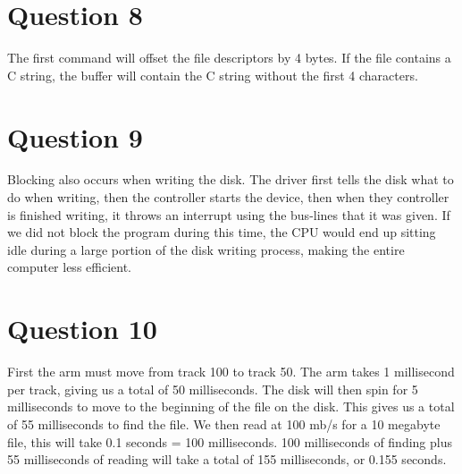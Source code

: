 \documentclass[12pt]{extarticle}
\begin{document}
		\section*{Question 8}
			The first command will offset the file descriptors by 4 bytes.  If the file contains a C string, the buffer will contain the C string without the first 4 characters.

		\section*{Question 9}
			Blocking also occurs when writing the disk.  The driver first tells the disk what to do when writing, then the controller starts the device, then when they controller is finished writing, it throws an interrupt using the bus-lines that it was given.  If we did not block the program during this time,  the CPU would end up sitting idle during a large portion of the disk writing process, making the entire computer less efficient.

		\section*{Question 10}
			First the arm must move from track 100 to track 50.  The arm takes 1 millisecond per track, giving us a total of 50 milliseconds.  The disk will then spin for 5 milliseconds to move to the beginning of the file on the disk.  This gives us a total of 55 milliseconds to find the file.  We then read at 100 mb/s for a 10 megabyte file, this will take 0.1 seconds = 100 milliseconds.  100 milliseconds of finding plus 55 milliseconds of reading will take a total of 155 milliseconds, or 0.155 seconds.
\end{document}
